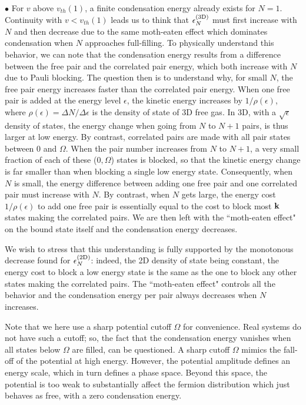 \documentclass[5p,twocolumn]{elsarticle}
\begin{document}
$\bullet$  For $v$ above $v_{th}(1)$, a finite condensation energy already exists for $N=1$. Continuity with $v<v_{th}(1)$ leads us to think that $\epsilon^{{\text{(3D)}}}_N$ must first increase with $N$ and then decrease due to the same moth-eaten effect which dominates condensation when $N$ approaches full-filling. 
To physically understand this behavior, we can note that the condensation energy results from a difference between the free pair and the correlated pair energy, which both increase with $N$ due to Pauli blocking.  The question then is to understand why, for small $N$, the free pair energy increases faster than the correlated pair energy. When one free pair is added at the energy level $\epsilon$, the kinetic energy increases by $1/\rho(\epsilon)$, where $\rho(\epsilon)=\Delta{}N/\Delta\epsilon$ is the density of state of 3D free gas.  In 3D, with a $\sqrt{\epsilon}$ density of states, the energy change when going from $N$ to $N+1$ pairs, is thus larger at low energy. By contrast, correlated pairs are made with all pair states between $0$ and $\Omega$. When the pair number increases from $N$ to $N+1$, a very small fraction of each of these ($0,\Omega$) states is blocked, so that the kinetic energy change is far smaller than when blocking a single low energy state.  Consequently, when $N$ is small,  the energy difference between adding one free pair and one correlated pair must increase with $N$. By contrast, when $N$ gets large, the energy cost $1/\rho(\epsilon)$ to add one free pair is essentially equal to the cost to block most $\mathbf{k}$ states making the correlated pairs.  We are then left with the ``moth-eaten effect" on the bound state itself and the condensation energy decreases. 

We wish to stress that this understanding is fully supported by the monotonous decrease  found for $\epsilon^{{\text{(2D)}}}_N$: indeed, the 2D density of state being constant, the energy cost to block a low energy state is the same as the one to block  any other states making the correlated pairs. The ``moth-eaten effect" controls all the behavior and the condensation energy per pair always decreases when $N$ increases.

Note that we here use a sharp potential cutoff $\Omega$ for convenience.  Real systems do not have such a cutoff; so,   the fact that the condensation energy vanishes when all states below $\Omega$ are filled, can be questioned.  A sharp cutoff $\Omega$ mimics the fall-off of the potential at high energy.  However, the potential amplitude defines an energy scale, which in turn defines a phase space.  Beyond this space, the potential is too weak to substantially affect the fermion distribution which just behaves as free, with a zero condensation energy. 
\end{document}
